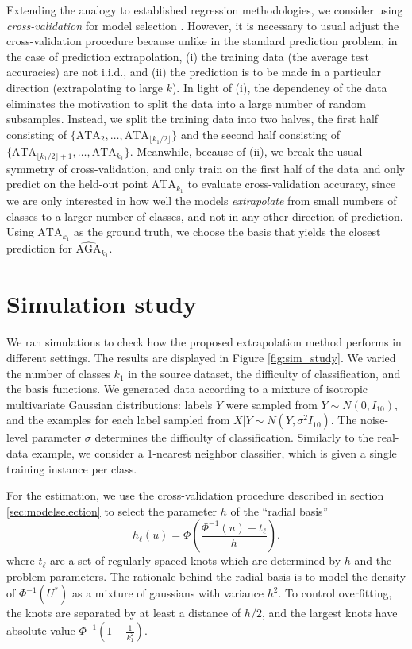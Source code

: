 \documentclass[twoside,11pt]{article}
\begin{document}
Extending the analogy to established regression methodologies, we
consider using \emph{cross-validation} for model selection
\citep{Hastie2009a}.  However, it is necessary to usual adjust the
cross-validation procedure because unlike in the standard prediction
problem, in the case of prediction extrapolation, (i) the training
data (the average test accuracies) are not i.i.d., and (ii) the
prediction is to be made in a particular direction (extrapolating to
large $k$).  In light of (i), the dependency of the data eliminates
the motivation to split the data into a large number of random
subsamples.  Instead, we split the training data into two halves, the
first half consisting of $\{\text{ATA}_{2},\hdots, \text{ATA}_{\lfloor
  k_1/2 \rfloor}\}$ and the second half consisting of
$\{\text{ATA}_{\lfloor k_1/2 \rfloor + 1},\hdots, \text{ATA}_{k_1}\}$.
Meanwhile, because of (ii), we break the usual symmetry of
cross-validation, and only train on the first half of the data and
only predict on the held-out point $\text{ATA}_{k_1}$ to evaluate
cross-validation accuracy, since we are only interested in how well
the models \emph{extrapolate} from small numbers of classes to a
larger number of classes, and not in any other direction of
prediction.  Using $\text{ATA}_{k_1}$ as the ground truth, we choose
the basis that yields the closest prediction for
$\hat{\text{AGA}}_{k_1}$.

\section{Simulation study}\label{sec:simulation_study}

We ran simulations to check how the proposed extrapolation method
performs in different settings.  The results are displayed in Figure
\ref{fig:sim_study}. 
We varied the number of classes $k_1$ in the
source dataset, the difficulty of classification, and the basis
functions. We generated data according to a mixture of isotropic
multivariate Gaussian distributions: labels $Y$ were sampled from $Y
\sim N(0, I_{10})$, and the examples for each label sampled from $X|Y
\sim N(Y, \sigma^2 I_{10})$. The noise-level parameter $\sigma$
determines the difficulty of classification. Similarly to the
real-data example, we consider a 1-nearest neighbor classifier, which
is given a single training instance per class.

For the estimation, we use the cross-validation procedure described
in section \ref{sec:modelselection} to select the parameter $h$ of the
``radial basis''
\[
h_\ell(u) = \Phi\left(\frac{\Phi^{-1}(u) - t_\ell}{h}\right).
\]
where $t_\ell$ are a set of regularly spaced knots which are
determined by $h$ and the problem parameters.  The rationale behind
the radial basis is to model the density of $\Phi^{-1}(U^*)$ as a
mixture of gaussians with variance $h^2$.  To control overfitting, the
knots are separated by at least a distance of $h/2$, and the largest
knots have absolute value $\Phi^{-1}(1 - \frac{1}{k_1^2}).$
\end{document}
